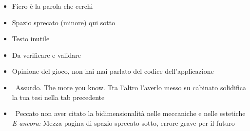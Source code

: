 {\begin{itemize}
  \item {} Fiero è la parola che cerchi
  \item {} Spazio sprecato (minore) qui sotto
  \item {} Testo inutile
  \item {} Da verificare e validare
  \item {} Opinione del gioco, non hai mai parlato del codice dell'applicazione
  \item {} \rvBene\ Assurdo. The more you know. Tra l'altro l'averlo messo su cabinato solidifica la tua tesi nella tab precedente
  \item {} \rvAvviso\ Peccato non aver citato la bidimensionalità nelle meccaniche e nelle estetiche \emph{E ancora:} Mezza pagina di spazio sprecato sotto, errore grave per il futuro
\end{itemize}
}

